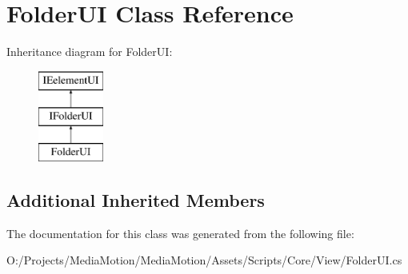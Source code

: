 \hypertarget{class_folder_u_i}{\section{Folder\+U\+I Class Reference}
\label{class_folder_u_i}
}
Inheritance diagram for Folder\+U\+I\+:\begin{figure}[H]
\begin{center}
\leavevmode
\includegraphics[height=3.000000cm]{class_folder_u_i}
\end{center}
\end{figure}
\subsection*{Additional Inherited Members}


The documentation for this class was generated from the following file\+:\begin{DoxyCompactItemize}
\item 
O\+:/\+Projects/\+Media\+Motion/\+Media\+Motion/\+Assets/\+Scripts/\+Core/\+View/Folder\+U\+I.\+cs\end{DoxyCompactItemize}
